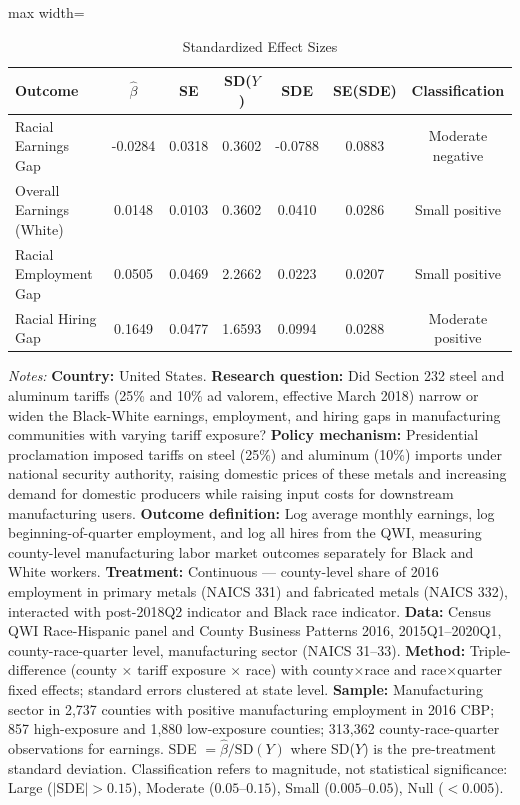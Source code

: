 \begin{table}
\begin{threeparttable}[htbp]
\centering
\caption{Standardized Effect Sizes}
\label{tab:sde}
\small
\begin{adjustbox}{max width=\textwidth}
\begin{tabular}{lcccccc}
\toprule
Outcome & $\hat{\beta}$ & SE & SD($Y$) & SDE & SE(SDE) & Classification \\
\midrule
Racial Earnings Gap & -0.0284 & 0.0318 & 0.3602 & -0.0788 & 0.0883 & Moderate negative \\
Overall Earnings (White) & 0.0148 & 0.0103 & 0.3602 & 0.0410 & 0.0286 & Small positive \\
Racial Employment Gap & 0.0505 & 0.0469 & 2.2662 & 0.0223 & 0.0207 & Small positive \\
Racial Hiring Gap & 0.1649 & 0.0477 & 1.6593 & 0.0994 & 0.0288 & Moderate positive \\
\bottomrule
\end{tabular}
\end{adjustbox}
\begin{tablenotes}
\small
\item \textit{Notes:} \textbf{Country:} United States. \textbf{Research question:} Did Section 232 steel and aluminum tariffs (25\% and 10\% ad valorem, effective March 2018) narrow or widen the Black-White earnings, employment, and hiring gaps in manufacturing communities with varying tariff exposure? \textbf{Policy mechanism:} Presidential proclamation imposed tariffs on steel (25\%) and aluminum (10\%) imports under national security authority, raising domestic prices of these metals and increasing demand for domestic producers while raising input costs for downstream manufacturing users. \textbf{Outcome definition:} Log average monthly earnings, log beginning-of-quarter employment, and log all hires from the QWI, measuring county-level manufacturing labor market outcomes separately for Black and White workers. \textbf{Treatment:} Continuous --- county-level share of 2016 employment in primary metals (NAICS 331) and fabricated metals (NAICS 332), interacted with post-2018Q2 indicator and Black race indicator. \textbf{Data:} Census QWI Race-Hispanic panel and County Business Patterns 2016, 2015Q1--2020Q1, county-race-quarter level, manufacturing sector (NAICS 31--33). \textbf{Method:} Triple-difference (county $\times$ tariff exposure $\times$ race) with county$\times$race and race$\times$quarter fixed effects; standard errors clustered at state level. \textbf{Sample:} Manufacturing sector in 2,737 counties with positive manufacturing employment in 2016 CBP; 857 high-exposure and 1,880 low-exposure counties; 313,362 county-race-quarter observations for earnings. SDE $= \hat{\beta} / \text{SD}(Y)$ where SD($Y$) is the pre-treatment standard deviation. Classification refers to magnitude, not statistical significance: Large ($|$SDE$| > 0.15$), Moderate ($0.05$--$0.15$), Small ($0.005$--$0.05$), Null ($< 0.005$).
\end{tablenotes}
\end{threeparttable}
\end{table}
